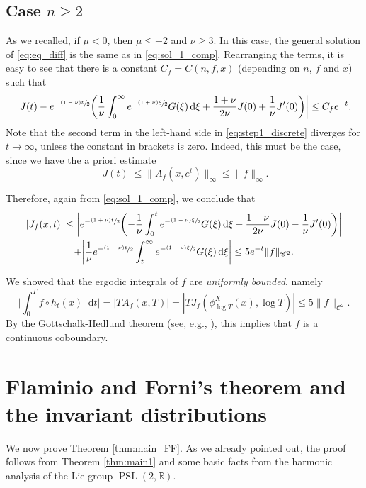 \documentclass[10pt]{amsart}
\newcommand{\tpsfrac}[3]{\sfrac{(#1)#3}{#2}}
\newcommand \R{\mathbb{R}}
\newcommand*{\diff}{\mathop{}\!\mathrm{d}}
\newcommand{\aver}[1]{A_{#1}(x,T)}
\DeclareMathOperator{\PSL}{PSL}
\theoremstyle{definition}
\begin{document}
\subsection{Case $n\geq 2$}

As we recalled, if $\mu <0$, then $\mu \leq -2$ and $\nu \geq 3$.
In this case, the general solution of \eqref{eq:eq_diff} is the same as in \eqref{eq:sol_1_comp}.
Rearranging the terms, it is easy to see that there is a constant $C_f= C(n,f,x)$ (depending on $n$, $f$ and $x$) such that
\begin{equation}\label{eq:step1_discrete}
\biggl\lvert J(t) - e^{-\tpsfrac{1-\nu}{2}t} \biggl(\frac{1}{\nu} \int_0^{\infty} e^{-\tpsfrac{1+\nu}{2}\xi} G(\xi) \diff \xi + \frac{1+\nu}{2\nu} J(0) + \frac{1}{\nu}J'(0) \biggr) \biggr\rvert \leq C_f e^{-t}.
\end{equation}
Note that the second term in the left-hand side in \eqref{eq:step1_discrete} diverges for $t \to \infty$, unless the constant in brackets is zero.
Indeed, this must be the case, since we have the a priori estimate
\[
|J(t)|\leq \|A_f(x,e^t) \|_\infty \leq \|f\|_\infty.
\]

Therefore, again from \eqref{eq:sol_1_comp}, we conclude that
\begin{multline}\label{eq:estimate_discrete}
|J_{f}(x,t)|\leq \biggl\lvert e^{-\tpsfrac{1+\nu}{2}t} \biggl(- \frac{1}{\nu} \int_0^t e^{-\tpsfrac{1-\nu}{2}\xi} G(\xi) \diff \xi - \frac{1-\nu}{2\nu} J(0) - \frac{1}{\nu}J'(0) \biggr) \biggr\rvert \\
+ \biggl\lvert \frac{1}{\nu} e^{-\tpsfrac{1-\nu}{2}t} \int_t^{\infty} e^{-\tpsfrac{1+\nu}{2}\xi} G(\xi) \diff \xi \biggr\rvert
\leq 5e^{-t}\|f\|_{\mathscr{C}^2}.
\end{multline}

We showed that the ergodic integrals of $f$ are \emph{uniformly bounded}, namely
\[
\biggl\lvert \int_0^T f \circ h_t (x) \diff t \biggr\rvert = |T \aver{f}|= |T J_{f}(\phi^X_{\log T}(x), \log T)|\leq 5\|f\|_{\mathscr{C}^2}.
\]
By the Gottschalk-Hedlund theorem (see, e.g., \cite[Th.\,C]{McC}), this implies that $f$ is a continuous coboundary.

\section{Flaminio and Forni's theorem and the invariant distributions}\label{section:FF}

We now prove Theorem \ref{thm:main_FF}. As we already pointed out, the proof follows from Theorem \ref{thm:main1} and some basic facts from the harmonic analysis of the Lie group $\PSL(2,\R)$.
\end{document}
